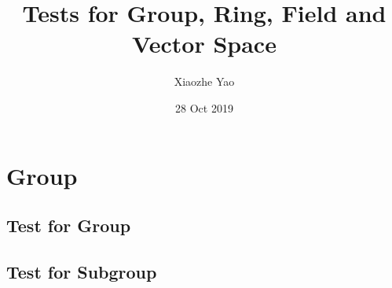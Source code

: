 \documentclass{article}
\title{Tests for Group, Ring, Field and Vector Space}
\author{Xiaozhe Yao}
\date{28 Oct 2019}
\begin{document}
\maketitle
\section{Group}
\subsection{Test for Group}
\subsection{Test for Subgroup}
\end{document}
